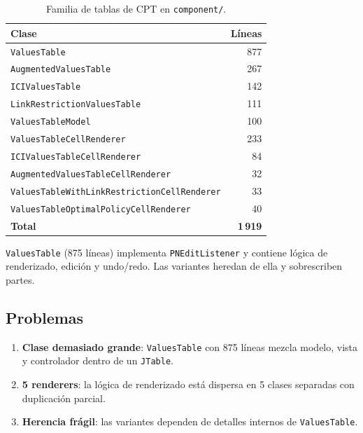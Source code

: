 \documentclass[12pt,a4paper]{article}
\newcommand{\code}[1]{\texttt{#1}}
\newcommand{\clase}[1]{\texttt{#1}}
\newcommand{\paquete}[1]{\texttt{#1}}
\newcommand{\bad}[1]{\textcolor{codered}{\textbf{#1}}}
\newcommand{\warn}[1]{\textcolor{warnorange}{\textbf{#1}}}
\begin{document}
\begin{table}[H]
\centering
\small
\begin{tabular}{lr}
\toprule
\textbf{Clase} & \textbf{Líneas} \\
\midrule
\clase{ValuesTable}                     & 877 \\
\clase{AugmentedValuesTable}            & 267 \\
\clase{ICIValuesTable}                  & 142 \\
\clase{LinkRestrictionValuesTable}      & 111 \\
\clase{ValuesTableModel}                & 100 \\
\clase{ValuesTableCellRenderer}         & 233 \\
\clase{ICIValuesTableCellRenderer}      & 84  \\
\clase{AugmentedValuesTableCellRenderer}          & 32  \\
\clase{ValuesTableWithLinkRestrictionCellRenderer} & 33  \\
\clase{ValuesTableOptimalPolicyCellRenderer}       & 40  \\
\midrule
\textbf{Total}                          & \textbf{1\,919} \\
\bottomrule
\end{tabular}
\caption{Familia de tablas de CPT en \paquete{component/}.}
\label{tab:r6-tables}
\end{table}

\clase{ValuesTable} (875 líneas) implementa \code{PNEditListener} y
contiene lógica de renderizado, edición y undo/redo. Las variantes
heredan de ella y sobrescriben partes.

\subsection{Problemas}

\begin{enumerate}
  \item \bad{Clase demasiado grande}: \clase{ValuesTable} con 875 líneas
        mezcla modelo, vista y controlador dentro de un \code{JTable}.
  \item \warn{5 renderers}: la lógica de renderizado está dispersa en
        5 clases separadas con duplicación parcial.
  \item \warn{Herencia frágil}: las variantes dependen de detalles
        internos de \clase{ValuesTable}.
\end{enumerate}
\end{document}
